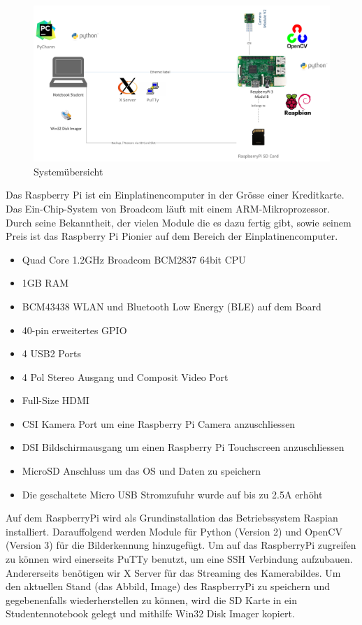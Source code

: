 \documentclass[a4paper]{report}
\begin{document}
\begin{figure}[h!]
	\includegraphics[keepaspectratio,width=\textwidth]{TargetRecOS}
	\caption{Systemübersicht}
	\label{fig:Systemuebersicht}
\end{figure}

Das Raspberry Pi ist ein Einplatinencomputer in der Grösse einer Kreditkarte. Das Ein-Chip-System von Broadcom läuft mit einem ARM-Mikroprozessor. Durch seine Bekanntheit, der vielen Module die es dazu fertig gibt, sowie seinem Preis ist das Raspberry Pi Pionier auf dem Bereich der Einplatinencomputer.

\begin{itemize}[noitemsep]
	\item Quad Core 1.2GHz Broadcom BCM2837 64bit CPU
	\item 1GB RAM
	\item BCM43438 WLAN und Bluetooth Low Energy (BLE) auf dem Board
	\item 40-pin erweitertes GPIO
	\item 4 USB2 Ports
	\item 4 Pol Stereo Ausgang und Composit Video Port
	\item Full-Size HDMI
	\item CSI Kamera Port um eine Raspberry Pi Camera anzuschliessen
	\item DSI Bildschirmausgang um einen Raspberry Pi Touchscreen anzuschliessen
	\item MicroSD Anschluss um das OS und Daten zu speichern
	\item Die geschaltete Micro USB Stromzufuhr wurde auf bis zu 2.5A erhöht
\end{itemize}\parencite{RaspberryPiFoundation2017}

\vspace{1em}
Auf dem RaspberryPi wird als Grundinstallation das Betriebssystem Raspian installiert. Darauffolgend werden Module für Python (Version 2) und OpenCV (Version 3) für die Bilderkennung hinzugefügt.
Um auf das RaspberryPi zugreifen zu können wird einerseits PuTTy benutzt, um eine SSH Verbindung aufzubauen. Andererseits benötigen wir X Server für das Streaming des Kamerabildes.
Um den aktuellen Stand (das Abbild, Image) des RaspberryPi zu speichern und gegebenenfalls wiederherstellen zu können, wird die SD Karte in ein Studentennotebook gelegt und mithilfe Win32 Disk Imager kopiert.
\end{document}
